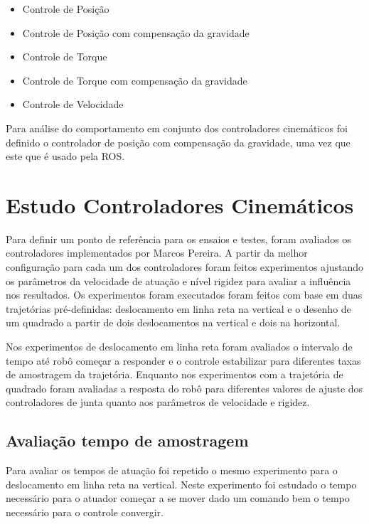 \begin{itemize}
    \item Controle de Posição
    \item Controle de Posição com compensação da gravidade
    \item Controle de Torque
    \item Controle de Torque com compensação da gravidade
    \item Controle de Velocidade
\end{itemize}


Para análise do comportamento em conjunto dos controladores cinemáticos foi definido o controlador de posição com compensação da gravidade, uma vez que este que é usado pela ROS.

\section{Estudo Controladores Cinemáticos}

Para definir um ponto de referência para os ensaios e testes, foram avaliados os controladores implementados por Marcos Pereira. A partir da melhor configuração para cada um dos controladores foram feitos experimentos ajustando os parâmetros da velocidade de atuação e nível rigidez para avaliar a influência nos resultados. Os experimentos foram executados foram feitos com base em duas trajetórias pré-definidas: deslocamento em linha reta na vertical e o desenho de um quadrado a partir de dois deslocamentos na vertical e dois na horizontal.

Nos experimentos de deslocamento em linha reta foram avaliados o intervalo de tempo até robô começar a responder e o controle estabilizar para diferentes taxas de amostragem da trajetória. Enquanto nos experimentos com a trajetória de quadrado foram avaliadas a resposta do robô para diferentes valores de ajuste dos controladores de junta quanto aos parâmetros de velocidade e rigidez.

\subsection{Avaliação tempo de amostragem}

Para avaliar os tempos de atuação foi repetido o mesmo experimento para o deslocamento em linha reta na vertical. Neste experimento foi estudado o tempo necessário para o atuador começar a se mover dado um comando bem o tempo necessário para o controle convergir.

